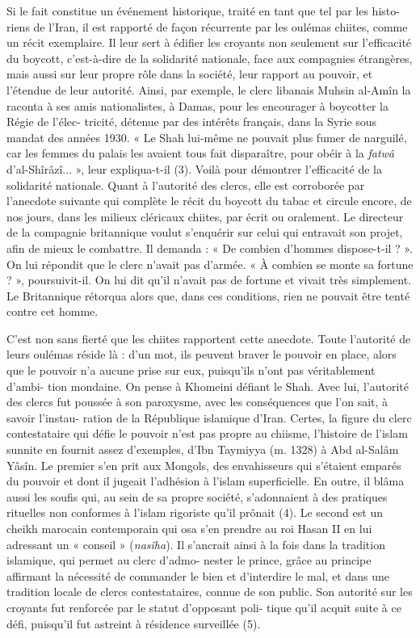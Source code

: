 Si le fait constitue un événement historique, traité en tant que tel par
les histo- riens de l'Iran, il est rapporté de façon récurrente par les
oulémas chiites, comme un récit exemplaire. Il leur sert à édifier les
croyants non seulement sur l'efficacité du boycott, c'est-à-dire de la
solidarité nationale, face aux compagnies étrangères, mais aussi sur
leur propre rôle dans la société, leur rapport au pouvoir, et l'étendue
de leur autorité. Ainsi, par exemple, le clerc libanais Muhsin al-Amîn
la raconta à ses amis nationalistes, à Damas, pour les encourager à
boycotter la Régie de l'élec- tricité, détenue par des intérêts
français, dans la Syrie sous mandat des années 1930. « Le Shah lui-même
ne pouvait plus fumer de narguilé, car les femmes du palais les avaient
tous fait disparaître, pour obéir à la \emph{fatwâ} d'al-Shîrâzî... »,
leur expliqua-t-il (3). Voilà pour démontrer l'efficacité de la
solidarité nationale. Quant à l'autorité des clercs, elle est corroborée
par l'anecdote suivante qui complète le récit du boycott du tabac et
circule encore, de nos jours, dans les milieux cléricaux
chiites, par écrit ou oralement. Le directeur de la compagnie
britannique voulut s'enquérir sur celui qui entravait son projet, afin
de mieux le combattre. Il demanda : « De combien d'hommes dispose-t-il ?
». On lui répondit que le clerc n'avait pas d'armée. « À combien se
monte sa fortune ? », poursuivit-il. On lui dit qu'il n'avait pas de
fortune et vivait très simplement. Le Britannique rétorqua alors que,
dans ces conditions, rien ne pouvait être tenté contre cet homme.

C'est non sans fierté que les chiites rapportent cette anecdote. Toute
l'autorité de leurs oulémas réside là : d'un mot, ils peuvent braver le
pouvoir en place, alors que le pouvoir n'a aucune prise sur eux,
puisqu'ils n'ont pas véritablement d'ambi- tion mondaine. On pense à
Khomeini défiant le Shah. Avec lui, l'autorité des clercs fut poussée à
son paroxysme, avec les conséquences que l'on sait, à savoir l'instau-
ration de la République islamique d'Iran. Certes, la figure du clerc
contestataire qui défie le pouvoir n'est pas propre au chiisme,
l'histoire de l'islam sunnite en fournit assez d'exemples, d'Ibn
Taymiyya (m. 1328) à Abd al-Salâm Yâsîn. Le premier s'en prit aux
Mongols, des envahisseurs qui s'étaient emparés du pouvoir et dont il
jugeait l'adhésion à l'islam superficielle. En outre, il blâma aussi les
soufis qui, au sein de sa propre société, s'adonnaient à des pratiques
rituelles non conformes à l'islam rigoriste qu'il prônait (4). Le second
est un cheikh marocain contemporain qui osa s'en prendre au roi Hasan II
en lui adressant un « conseil » (\emph{nasîha}). Il s'ancrait ainsi à la
fois dans la tradition islamique, qui permet au clerc d'admo- nester le
prince, grâce au principe affirmant la nécessité de commander le bien et
d'interdire le mal, et dans une tradition locale de clercs
contestataires, connue de son public. Son autorité sur les croyants fut
renforcée par le statut d'opposant poli- tique qu'il acquit suite à ce
défi, puisqu'il fut astreint à résidence surveillée (5).

